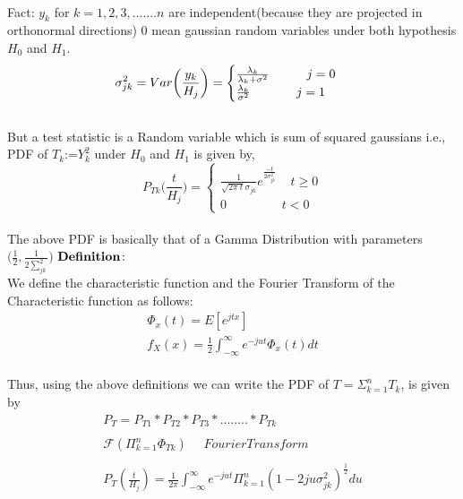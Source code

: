 \documentclass[a4paper,english,12pt]{article}
\begin{document}
 \\Fact:  $y_k$ for $k=1,2,3,.......n$ are independent(because they are projected in orthonormal directions) 0 mean gaussian random variables under both hypothesis $H_0$ and $H_1$.\\
 \begin{equation*}
 \sigma_{jk}^2= Var\bigg(\frac{y_k}{H_j}\bigg)\\
 =\begin{cases}
 	\frac{\lambda_k}{\lambda_k+\sigma^2} \ \ \ \ \ \ \ \ \ j=0\\
 	\frac{\lambda_k}{\sigma^2} \ \ \ \ \ \ \ \ \ \ \ j=1
 	\end{cases}
 \end{equation*}
 \\ But a test statistic is a Random variable which is sum of squared gaussians i.e., PDF of $T_k$:=$Y_k^2$ under $H_0$ and $H_1$ is given by,
 \begin{equation*}
 P_{Tk}\bigg(\frac{t}{H_j}\bigg)=\begin{cases}
 	\frac{1}{\sqrt{2\pi\ t}\sigma_{jk}}e^\frac{-t}{2\sigma_{jk}^2} \ \ \ \ \ t\ge0\\
 	0 \ \ \ \ \ \ \ \ \ \ \ \ \ \ \ \ \ \ \ \ t<0
 	\end{cases}
 \end{equation*}\\
 The above PDF is basically that of a Gamma Distribution with parameters $\bigg(\frac{1}{2},\frac{1}{2\sum_{jk}^2}\bigg)$
 $\\\textbf{Definition}\colon$\\
 We define the characteristic function and the Fourier Transform of the Characteristic function as follows:\\
 \begin{align*}
 \Phi_x(t) = E[e^{jtx}]\\
 f_X(x)=\frac{1}{2}\int_{-\infty}^{\infty}e^{-jut}\Phi_x(t)dt
 \end{align*}
 \\Thus, using the above definitions we can write the PDF of ${T=\Sigma_{k=1}^{n}T_k}$, is given by\\
 \begin{align*}
 P_T= P_{T1}*P_{T2}*P_{T3}*........*P_{Tk}\\
 \\\mathcal{F}(\Pi_{k=1}^{n}\Phi_{Tk}) \ \ \ \ \ \ Fourier Transform \\
 \\P_T(\frac{t}{H_j})=\frac{1}{2\pi}\int_{-\infty}^{\infty}e^{-jut}\Pi_{k=1}^{n}(1-2ju\sigma_{jk}^2)^{\frac{1}{2}}du
 \end{align*}\\
\end{document}
